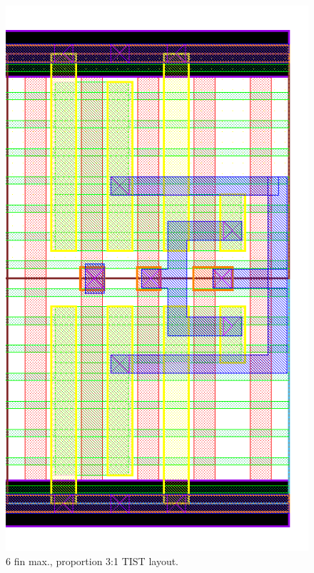 \documentclass[pgmicro,mestrado,english]{iiufrgs}
\begin{document}
\begin{figure}[H]
\centering
\includegraphics[width=\textwidth,height=\textheight,keepaspectratio]{TIST6F2F.png}
\caption{6 fin max., proportion 3:1 TIST layout.}
\label{fig:TIST4F}
\end{figure}
\end{document}
